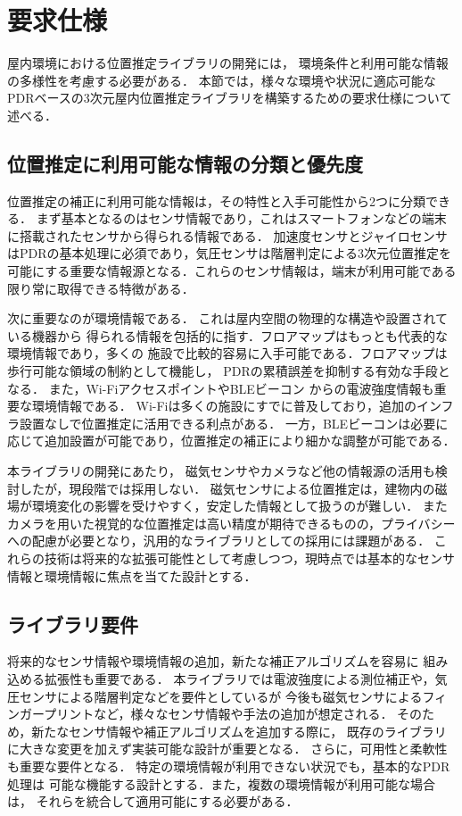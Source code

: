 

\section{要求仕様}

屋内環境における位置推定ライブラリの開発には，
環境条件と利用可能な情報の多様性を考慮する必要がある．
本節では，様々な環境や状況に適応可能なPDRベースの3次元屋内位置推定ライブラリを構築するための要求仕様について述べる．

\subsection{位置推定に利用可能な情報の分類と優先度}

位置推定の補正に利用可能な情報は，その特性と入手可能性から2つに分類できる．
まず基本となるのはセンサ情報であり，これはスマートフォンなどの端末に搭載されたセンサから得られる情報である．
加速度センサとジャイロセンサはPDRの基本処理に必須であり，気圧センサは階層判定による3次元位置推定を可能にする重要な情報源となる．これらのセンサ情報は，端末が利用可能である限り常に取得できる特徴がある．

次に重要なのが環境情報である．
これは屋内空間の物理的な構造や設置されている機器から
得られる情報を包括的に指す．フロアマップはもっとも代表的な環境情報であり，多くの
施設で比較的容易に入手可能である．フロアマップは歩行可能な領域の制約として機能し，
PDRの累積誤差を抑制する有効な手段となる．
また，Wi-FiアクセスポイントやBLEビーコン
からの電波強度情報も重要な環境情報である．
Wi-Fiは多くの施設にすでに普及しており，追加のインフラ設置なしで位置推定に活用できる利点がある．
一方，BLEビーコンは必要に応じて追加設置が可能であり，位置推定の補正により細かな調整が可能である．

本ライブラリの開発にあたり，
磁気センサやカメラなど他の情報源の活用も検討したが，現段階では採用しない．
磁気センサによる位置推定は，建物内の磁場が環境変化の影響を受けやすく，安定した情報として扱うのが難しい．
またカメラを用いた視覚的な位置推定は高い精度が期待できるものの，プライバシーへの配慮が必要となり，汎用的なライブラリとしての採用には課題がある．
これらの技術は将来的な拡張可能性として考慮しつつ，現時点では基本的なセンサ情報と環境情報に焦点を当てた設計とする．

\subsection{ライブラリ要件}

将来的なセンサ情報や環境情報の追加，新たな補正アルゴリズムを容易に
組み込める拡張性も重要である．
本ライブラリでは電波強度による測位補正や，気圧センサによる階層判定などを要件としているが
今後も磁気センサによるフィンガープリントなど，様々なセンサ情報や手法の追加が想定される．
そのため，新たなセンサ情報や補正アルゴリズムを追加する際に，
既存のライブラリに大きな変更を加えず実装可能な設計が重要となる．
さらに，可用性と柔軟性も重要な要件となる．
特定の環境情報が利用できない状況でも，基本的なPDR処理は
可能な機能する設計とする．また，複数の環境情報が利用可能な場合は，
それらを統合して適用可能にする必要がある．



